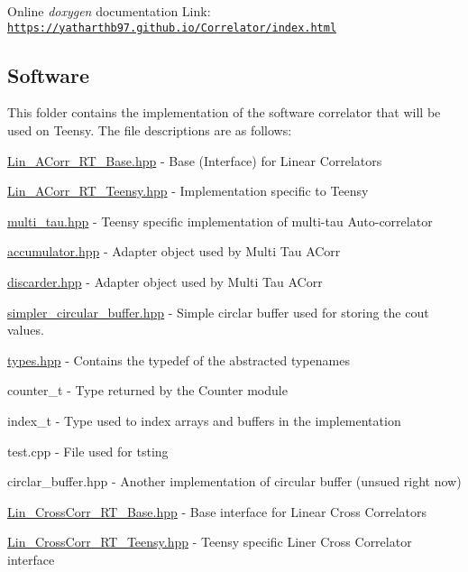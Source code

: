 Online {\itshape doxygen} documentation Link\+: \href{https://yatharthb97.github.io/Correlator/index.html}{\tt https\+://yatharthb97.\+github.\+io/\+Correlator/index.\+html}

\subsection*{Software}

This folder contains the implementation of the software correlator that will be used on Teensy. The file descriptions are as follows\+:


\begin{DoxyItemize}
\item {\ttfamily \hyperlink{Lin__ACorr__RT__Base_8hpp}{Lin\+\_\+\+A\+Corr\+\_\+\+R\+T\+\_\+\+Base.\+hpp}} -\/ Base (Interface) for Linear Correlators
\item {\ttfamily \hyperlink{Lin__ACorr__RT__Teensy_8hpp}{Lin\+\_\+\+A\+Corr\+\_\+\+R\+T\+\_\+\+Teensy.\+hpp}} -\/ Implementation specific to Teensy
\item {\ttfamily \hyperlink{multi__tau_8hpp}{multi\+\_\+tau.\+hpp}} -\/ Teensy specific implementation of multi-\/tau Auto-\/correlator
\item {\ttfamily \hyperlink{accumulator_8hpp}{accumulator.\+hpp}} -\/ Adapter object used by Multi Tau A\+Corr
\item {\ttfamily \hyperlink{discarder_8hpp}{discarder.\+hpp}} -\/ Adapter object used by Multi Tau A\+Corr
\item {\ttfamily \hyperlink{simpler__circular__buffer_8hpp}{simpler\+\_\+circular\+\_\+buffer.\+hpp}} -\/ Simple circlar buffer used for storing the cout values.
\item {\ttfamily \hyperlink{types_8hpp}{types.\+hpp}} -\/ Contains the {\ttfamily typedef} of the abstracted typenames
\begin{DoxyItemize}
\item {\ttfamily counter\+\_\+t} -\/ Type returned by the Counter module
\item {\ttfamily index\+\_\+t} -\/ Type used to index arrays and buffers in the implementation
\end{DoxyItemize}
\item {\ttfamily test.\+cpp} -\/ File used for tsting
\item {\ttfamily circlar\+\_\+buffer.\+hpp} -\/ Another implementation of circular buffer (unsued right now)
\item {\ttfamily \hyperlink{Lin__CrossCorr__RT__Base_8hpp}{Lin\+\_\+\+Cross\+Corr\+\_\+\+R\+T\+\_\+\+Base.\+hpp}} -\/ Base interface for Linear Cross Correlators
\item {\ttfamily \hyperlink{Lin__CrossCorr__RT__Teensy_8hpp}{Lin\+\_\+\+Cross\+Corr\+\_\+\+R\+T\+\_\+\+Teensy.\+hpp}} -\/ Teensy specific Liner Cross Correlator interface
\end{DoxyItemize}

